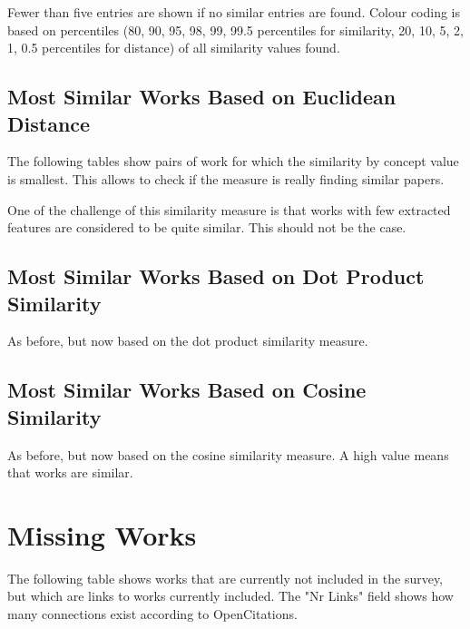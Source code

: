\documentclass[a4paper]{article}
\begin{document}
Fewer than five entries are shown if no similar entries are found. Colour coding is based on percentiles (80, 90, 95, 98, 99, 99.5 percentiles for similarity, 20, 10, 5, 2, 1, 0.5 percentiles for distance) of all similarity values found.



\clearpage
\subsection{Most Similar Works Based on Euclidean Distance}

The following tables show pairs of work for which the similarity by concept value is smallest. This allows to check if the measure is really finding similar papers.

One of the challenge of this similarity measure is that works with few extracted features are considered to be quite similar. This should not be the case.





\clearpage
\subsection{Most Similar Works Based on Dot Product Similarity}

As before, but now based on the dot product similarity measure.





\clearpage
\subsection{Most Similar Works Based on Cosine Similarity}
As before, but now based on the cosine similarity measure. A high value means that works are similar.





\clearpage
\section{Missing Works}

The following table shows works that are currently not included in the survey, but which are links to works currently included. The "Nr Links" field shows how many connections exist according to OpenCitations.
\end{document}

